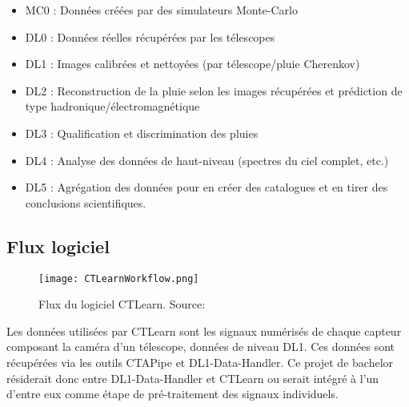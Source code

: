 \begin{itemize}
	\item MC0 : Données créées par des simulateurs Monte-Carlo
	\item DL0 : Données réelles récupérées par les télescopes
	\item DL1 : Images calibrées et nettoyées (par télescope/pluie Cherenkov)
	\item DL2 : Reconstruction de la pluie selon les images récupérées et prédiction de type hadronique/électromagnétique
	\item DL3 : Qualification et discrimination des pluies
	\item DL4 : Analyse des données de haut-niveau (spectres du ciel complet, etc.)
	\item DL5 : Agrégation des données pour en créer des catalogues et en tirer des conclusions scientifiques.
\end{itemize}

\subsection{Flux logiciel}

\begin{figure}[tbph!]
	\centering
	\texttt{[image: CTLearnWorkflow.png]}
	\caption[Flux du logiciel CTLearn]{Flux du logiciel CTLearn. Source: \cite{CTLearnWorkflow}}
\end{figure}

Les données utilisées par CTLearn sont les signaux numérisés de chaque capteur composant la caméra d'un télescope, données de niveau DL1.
Ces données sont récupérées via les outils CTAPipe et DL1-Data-Handler. 
Ce projet de bachelor résiderait donc entre DL1-Data-Handler et CTLearn ou serait intégré à l'un d'entre eux comme étape de pré-traitement des signaux individuels.